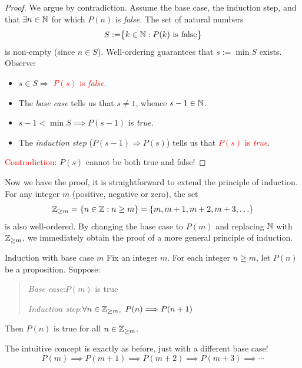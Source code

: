 \begin{proof}
	We argue by contradiction. Assume the base case, the induction step, and that $\exists n\in\mathbb{N}$ for which $P(n)$ is \emph{false.} The set of natural numbers
	\[
		S:=\bigr\{k\in\mathbb{N}:P(k)\text{ is false}\bigr\}
	\]
	is non-empty (since $n\in S$). Well-ordering guarantees that $s:=\min S$ exists. Observe:
	\begin{itemize}\itemsep0pt\parskip2pt
	  \item $s\in S\Longrightarrow$ \textcolor{red}{$P(s)$ is \emph{false}}.
	  \item The \emph{base case} tells us that $s\neq 1$, whence $s-1\in\mathbb{N}$.
	  \item $s-1<\min S\implies P(s-1)$ is \emph{true.}
	  \item The \emph{induction step} ($P(s-1)\Longrightarrow P(s)$) tells us that \textcolor{red}{$P(s)$ is \emph{true}}.
	\end{itemize}
	\textcolor{red}{Contradiction}: $P(s)$ cannot be both true and false!
\end{proof}


Now we have the proof, it is straightforward to extend the principle of induction. For any integer $m$ (positive, negative or zero), the set
\[
	\mathbb{Z}_{\ge m}=\{n\in\mathbb{Z}:n\ge m\}=\{m,m+1,m+2,m+3,\ldots\}
\]
is also well-ordered. By changing the base case to $P(m)$ and replacing $\mathbb{N}$ with $\mathbb{Z}_{\ge m}$, we immediately obtain the proof of a more general principle of induction.

\begin{cor}{Induction with base case $m$}{}
	Fix an integer $m$. For each integer $n\ge m$, let $P(n)$ be a proposition. Suppose:
	\begin{quote}
		\emph{Base case}:\lstsp $P(m)$ is true\par
		\emph{Induction step}:\lstsp $\forall n\in\mathbb{Z}_{\ge m},\ P(n)\Longrightarrow P(n+1)$
	\end{quote}
	Then $P(n)$ is true for all $n\in\mathbb{Z}_{\ge m}$.
\end{cor}

The intuitive concept is exactly as before, just with a different base case!
\[
	P(m)\implies P(m+1)\implies P(m+2)\implies P(m+3)\implies\cdots
\]
\goodbreak




